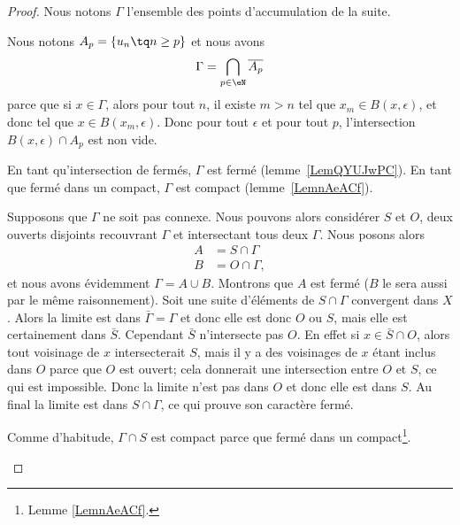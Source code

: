 \begin{proof}
	Nous notons \( \Gamma\) l'ensemble des points d'accumulation de la suite.
	\begin{subproof}
		Nous notons \( A_p=\{ u_n\tq n\geq p \}\) et nous avons
		\begin{equation}
			\Gamma=\bigcap_{p\in \eN}\overline{ A_p }
		\end{equation}
		parce que si \( x\in\Gamma\), alors pour tout \( n\), il existe \( m>n\) tel que \( x_m\in B(x,\epsilon)\), et donc tel que \( x\in B(x_m,\epsilon)\). Donc pour tout \( \epsilon\) et pour tout \( p\), l'intersection \( B(x,\epsilon)\cap A_p\) est non vide.

		En tant qu'intersection de fermés, \( \Gamma\) est fermé (lemme~\ref{LemQYUJwPC}). En tant que fermé dans un compact, \( \Gamma\) est compact (lemme~\ref{LemnAeACf}).


		Supposons que \( \Gamma\) ne soit pas connexe. Nous pouvons alors considérer \( S\) et \( O\), deux ouverts disjoints recouvrant \( \Gamma\) et intersectant tous deux \( \Gamma\). Nous posons alors
		\begin{subequations}
			\begin{align}
				A & =S\cap\Gamma  \\
				B & =O\cap\Gamma,
			\end{align}
		\end{subequations}
		et nous avons évidemment \( \Gamma=A\cup B\). Montrons que \( A\) est fermé (\( B\) le sera aussi par le même raisonnement). Soit une suite d'éléments de \( S\cap \Gamma\) convergent dans \( X\). Alors la limite est dans \( \bar\Gamma=\Gamma\) et donc elle est donc \( O\) ou \( S\), mais elle est certainement dans \( \bar S\). Cependant \( \bar S\) n'intersecte pas \( O\). En effet si \( x\in \bar S\cap O\), alors tout voisinage de \( x\) intersecterait \( S\), mais il y a des voisinages de \( x\) étant inclus dans \( O\) parce que \( O\) est ouvert; cela donnerait une intersection entre \( O\) et \( S\), ce qui est impossible. Donc la limite n'est pas dans \( O\) et donc elle est dans \( S\). Au final la limite est dans \( S\cap \Gamma\), ce qui prouve son caractère fermé.

		Comme d'habitude, \( \Gamma\cap S\) est compact parce que fermé dans un compact\footnote{Lemme \ref{LemnAeACf}.}.



\end{subproof}
\end{proof}
